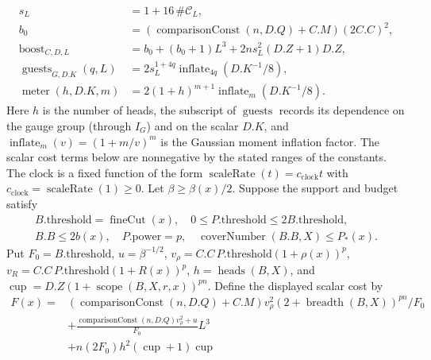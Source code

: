 \begin{proposition}
\begin{equation}
\begin{aligned}
 s_L&=1+16\,\#\mathcal C_L,\\
 b_0&=(\operatorname{comparisonConst}(n,D.Q)+C.M)(2C.C)^2,\\
 \operatorname{boost}_{C,D,L}&=b_0+(b_0+1)L^3
                     +2n s_L^2(D.Z+1)D.Z,\\
 \operatorname{guests}_{G,D.K}(q,L)&=2s_L^{1+4q}
                     \operatorname{inflate}_{4q}(D.K^{-1}/8),\\
 \operatorname{meter}(h,D.K,m)&=2(1+h)^{m+1}
                     \operatorname{inflate}_{m}(D.K^{-1}/8).
\end{aligned}
\label{eq:ex-lattice-scale-coefficients}
\end{equation}
Here \(h\) is the number of heads, the subscript of
\(\operatorname{guests}\) records its dependence on the gauge group
(through \(I_G\)) and on the scalar \(D.K\), and
\(\operatorname{inflate}_m(v)=(1+m/v)^m\) is the Gaussian moment
inflation factor. The scalar cost terms below
are nonnegative by the stated ranges of the constants. The clock is
a fixed function of the form
\(\operatorname{scaleRate}(t)=c_{\mathrm{clock}}t\) with
\(c_{\mathrm{clock}}=\operatorname{scaleRate}(1)\ge0\).
Let
\(\beta\ge\beta(x)/2\). Suppose the support and budget satisfy
\begin{equation}
 \begin{gathered}
 B.\mathrm{threshold}=\operatorname{fineCut}(x),\quad
 0\le P.\mathrm{threshold}\le2B.\mathrm{threshold},\\
 B.B\le2b(x),\quad P.\mathrm{power}=p,\quad
 \operatorname{coverNumber}(B.B,X)\le P_*(x).
 \end{gathered}
 \label{eq:ex-lattice-budget-support}
\end{equation}
Put \(F_0=B.\mathrm{threshold}\), \(u=\beta^{-1/2}\),
\(v_\rho=C.C\,P.\mathrm{threshold}(1+\rho(x))^p\),
\(v_R=C.C\,P.\mathrm{threshold}(1+R(x))^p\),
\(h=\operatorname{heads}(B,X)\), and
\(\operatorname{cup}=D.Z(1+\operatorname{scope}(B,X,r,x))^{pn}\).
Define the displayed scalar cost by
\begin{equation}
\begin{aligned}
 F(x)={}&(\operatorname{comparisonConst}(n,D.Q)+C.M)v_\rho^2
       (2+\operatorname{breadth}(B,X))^{pn}/F_0\\
 &+\frac{\operatorname{comparisonConst}(n,D.Q)v_\rho^2+u}{F_0}L^3\\
 &+n(2F_0)h^2(\operatorname{cup}+1)\operatorname{cup}\\

\end{aligned}
\end{equation}
\end{proposition}
